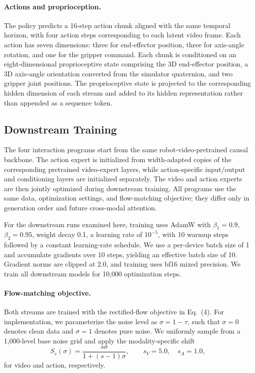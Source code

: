\paragraph{Actions and proprioception.}
The policy predicts a 16-step action chunk aligned with the same temporal horizon, with four action steps corresponding to each latent video frame. Each action has seven dimensions: three for end-effector position, three for axis-angle rotation, and one for the gripper command. Each chunk is conditioned on an eight-dimensional proprioceptive state comprising the 3D end-effector position, a 3D axis-angle orientation converted from the simulator quaternion, and two gripper joint positions. The proprioceptive state is projected to the corresponding hidden dimension of each stream and added to its hidden representation rather than appended as a sequence token.

\subsection{Downstream Training}
\label{sec:supp-training}

The four interaction programs start from the same robot-video-pretrained causal backbone. The action expert is initialized from width-adapted copies of the corresponding pretrained video-expert layers, while action-specific input/output and conditioning layers are initialized separately. The video and action experts are then jointly optimized during downstream training. All programs use the same data, optimization settings, and flow-matching objective; they differ only in generation order and future cross-modal attention.

For the downstream runs examined here, training uses AdamW with
$\beta_1=0.9$, $\beta_2=0.95$, weight decay 0.1, a learning rate of
$10^{-5}$, with 10 warmup steps followed by a constant learning-rate schedule.
We use a per-device batch size of 1 and accumulate gradients over 10 steps, yielding an effective batch size of 10. Gradient norms
are clipped at 2.0, and training uses bf16 mixed precision.
We train all downstream models for 10,000 optimization steps. 

\paragraph{Flow-matching objective.}
Both streams are trained with the rectified-flow objective in
Eq.~(4). For implementation, we parameterize the noise level as
$\sigma = 1-\tau$, such that $\sigma=0$ denotes clean data and
$\sigma=1$ denotes pure noise. We uniformly sample from a
1,000-level base noise grid and apply the modality-specific shift
\begin{equation}
S_s(\sigma)
=
\frac{s\sigma}{1+(s-1)\sigma},
\qquad
s_V=5.0,\quad s_A=1.0,
\end{equation}
for video and action, respectively.

